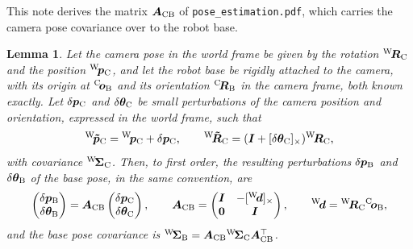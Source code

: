 \documentclass{article}
\newtheorem{lemma}{Lemma}
\newcommand{\thetab}{\bm{\theta}}
\begin{document}
This note derives the matrix $\bm{A}_\mathrm{CB}$ of \texttt{pose\_estimation.pdf}, which carries the camera pose covariance over to the robot base.

\begin{lemma}
Let the camera pose in the world frame be given by the rotation ${}^{\mathrm{W}}\! \bm{R}_{\mathrm{C}}$ and the position ${}^{\mathrm{W}}\! \bm{p}_{\mathrm{C}}$, and let the robot base be rigidly attached to the camera, with its origin at ${}^{\mathrm{C}}\! \bm{o}_{\mathrm{B}}$ and its orientation ${}^{\mathrm{C}}\! \bm{R}_{\mathrm{B}}$ in the camera frame, both known exactly.
Let $\delta\bm{p}_{\mathrm{C}}$ and $\delta\thetab_\C$ be small perturbations of the camera position and orientation, expressed in the world frame, such that
\[
\inW \pbt_\C = \inW \pb_\C + \delta\pb_\C, \qquad
\inW \Rbt_\C = (\Ib + [\delta\thetab_\C]_\times) \inW \Rb_\C,
\]
with covariance ${}^{\mathrm{W}}\! \bm{\Sigma}_{\mathrm{C}}$.
Then, to first order, the resulting perturbations $\delta\bm{p}_{\mathrm{B}}$ and $\delta\thetab_\B$ of the base pose, in the same convention, are
\[
\begin{pmatrix} \delta\pb_\B \\ \delta\thetab_\B \end{pmatrix}
= \Ab_\mathrm{CB} \begin{pmatrix} \delta\pb_\C \\ \delta\thetab_\C \end{pmatrix},
\qquad
\Ab_\mathrm{CB} = \begin{pmatrix} \Ib & -[\inW \db]_\times \\ \Zb & \Ib \end{pmatrix},
\qquad
\inW \db = \inW \Rb_\C \inC \ob_\B,
\]
and the base pose covariance is ${}^{\mathrm{W}}\! \bm{\Sigma}_{\mathrm{B}} = \bm{A}_\mathrm{CB} {}^{\mathrm{W}}\! \bm{\Sigma}_{\mathrm{C}} \bm{A}_\mathrm{CB}^\top$.
\end{lemma}
\end{document}
